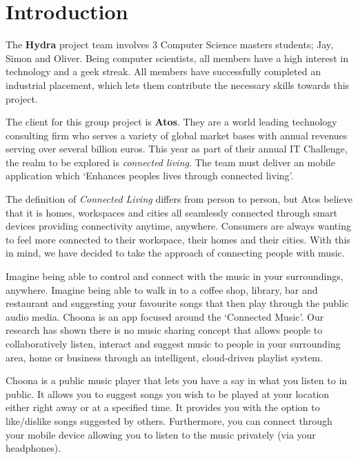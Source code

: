 \section{Introduction}

The \textbf{Hydra} project team involves 3 Computer Science masters students; Jay, Simon and Oliver. Being computer scientists, all members have a high interest in technology and a geek streak. All members have successfully completed an industrial placement, which lets them contribute the necessary skills towards this project.
		 	 	 		
The client for this group project is \textbf{Atos}. They are a world leading technology consulting firm who serves a variety of global market bases with annual revenues serving over several billion euros. This year as part of their annual IT Challenge, the realm to be explored is \emph{connected living}. The team must deliver an mobile application which `Enhances peoples lives through connected living'.

The definition of \emph{Connected Living} differs from person to person, but Atos believe that it is homes, workspaces and cities all seamlessly connected through smart devices providing connectivity anytime, anywhere.  Consumers are always wanting to feel more connected to their workspace, their homes and their cities.  With this in mind, we have decided to take the approach of connecting people with music.  

Imagine being able to control and connect with the music in your surroundings, anywhere.  Imagine being able to walk in to a coffee shop, library, bar and restaurant and suggesting your favourite songs that then play through the public audio media.  Choona is an app focused around the `Connected Music'.  Our research has shown there is no music sharing concept that allows people to collaboratively listen, interact and suggest music to people in your surrounding area, home or business through an intelligent, cloud-driven playlist system.  

Choona is a public music player that lets you have a say in what you listen to in public.  It allows you to suggest songs you wish to be played at your location either right away or at a specified time.  It provides you with the option to like/dislike songs suggested by others.  Furthermore, you can connect through your mobile device allowing you to listen to the music privately (via your headphones).
